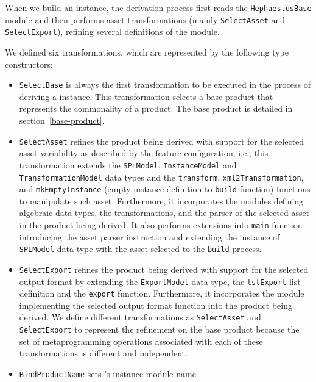 
When we build an \hpl{} instance, the derivation process first reads the \texttt{HephaestusBase} module and then performs \hp{} asset transformations (mainly \texttt{SelectAsset} and \texttt{SelectExport}), refining several definitions of the module. 

We defined six \hpl{} transformations, which are represented by the following type constructors:

\begin{itemize}

\item \texttt{SelectBase} is always the first transformation to be executed in the process of deriving a \hpl{} instance. This transformation selects a \hpl{} base product that represents the commonality of a \hpl{} product. The base product is detailed in section~\ref{base-product}.

\item \texttt{SelectAsset} refines the product being derived with support for the selected asset variability as described by the feature configuration, i.e., this transformation extends the \texttt{SPLModel}, \texttt{InstanceModel} and \texttt{TransformationModel} data types and the \texttt{transform}, \texttt{xml2Transformation}, and \texttt{mkEmptyInstance} (empty instance definition to \texttt{build} function) functions to manipulate such asset. Furthermore, it incorporates the modules defining algebraic data types, the transformations, and the parser of the selected asset in the product being derived.  It also performs extensions into \texttt{main} function introducing the asset parser instruction and extending the instance of \texttt{SPLModel} data type with the asset selected to the \texttt{build} process.

\item \texttt{SelectExport} refines the product being derived with support for the selected output format by extending the \texttt{ExportModel} data type, the \texttt{lstExport} list definition and the \texttt{export} function. Furthermore, it incorporates the module implementing the selected output format function into the product being derived. We define different transformations as \texttt{SelectAsset} and \texttt{SelectExport} to represent the refinement on the base product because the set of metaprogramming operations associated with each of these \hpl{} transformations is different and independent.

\item \texttt{BindProductName} sets \hpl{}'s instance module name.


\end{itemize}
